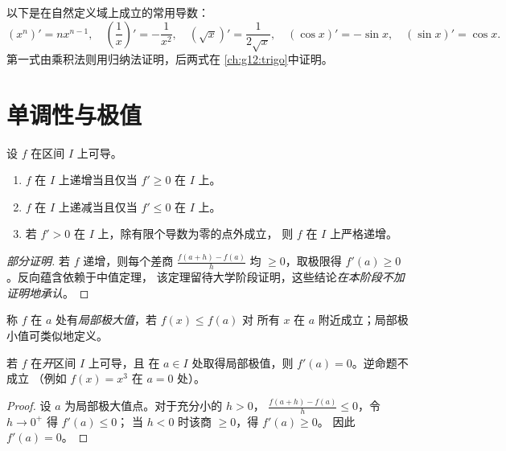 \begin{example}
以下是在自然定义域上成立的常用导数：
\[
(x^n)' = nx^{n-1}, \quad
\left(\frac{1}{x}\right)' = -\frac{1}{x^2}, \quad
(\sqrt{x})' = \frac{1}{2\sqrt{x}}, \quad
(\cos x)' = -\sin x, \quad
(\sin x)' = \cos x .
\]
第一式由乘积法则用归纳法证明，后两式在
\cref{ch:g12:trigo}中证明。
\end{example}

\section{单调性与极值}

\begin{theorem}[导数的符号与单调性]\label{thm:g12:deriv:variations}
设 $f$ 在区间 $I$ 上可导。
\begin{enumerate}
  \item $f$ 在 $I$ 上递增当且仅当 $f' \geq 0$ 在 $I$ 上。
  \item $f$ 在 $I$ 上递减当且仅当 $f' \leq 0$ 在 $I$ 上。
  \item 若 $f' > 0$ 在 $I$ 上，除有限个导数为零的点外成立，
        则 $f$ 在 $I$ 上严格递增。
\end{enumerate}
\end{theorem}

\begin{proof}[部分证明]
若 $f$ 递增，则每个差商
$\frac{f(a+h)-f(a)}{h}$ 均 $\geq 0$，取极限得
$f'(a) \geq 0$。反向蕴含依赖于中值定理，
该定理留待大学阶段证明，这些结论\emph{在本阶段不加证明地承认}。
\end{proof}

\begin{definition}[局部极值]\label{def:g12:deriv:extremum}
称 $f$ 在 $a$ 处有\emph{局部极大值}，若 $f(x) \leq f(a)$ 对
所有 $x$ 在 $a$ 附近成立；局部极小值可类似地定义。
\end{definition}

\begin{proposition}[一阶条件]\label{prop:g12:deriv:critical}
若 $f$ 在\emph{开}区间 $I$ 上可导，且
在 $a \in I$ 处取得局部极值，则 $f'(a) = 0$。逆命题不成立
（例如 $f(x) = x^3$ 在 $a = 0$ 处）。
\end{proposition}

\begin{proof}
设 $a$ 为局部极大值点。对于充分小的 $h > 0$，
$\frac{f(a+h)-f(a)}{h} \leq 0$，令 $h \to 0^+$ 得 $f'(a) \leq 0$；
当 $h < 0$ 时该商 $\geq 0$，得 $f'(a) \geq 0$。
因此 $f'(a) = 0$。
\end{proof}

